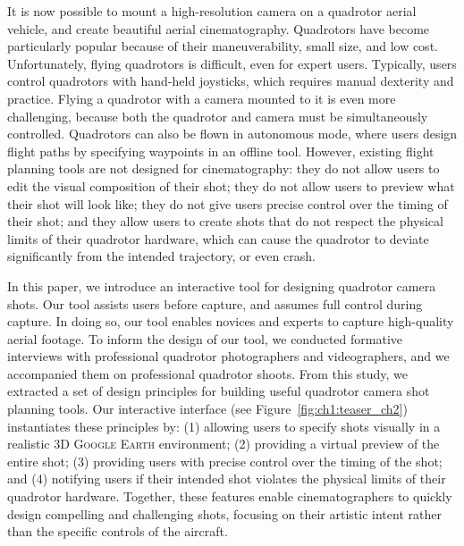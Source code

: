 
It is now possible to mount a high-resolution camera on a quadrotor aerial vehicle, and create beautiful aerial cinematography.
Quadrotors have become particularly popular because of their maneuverability, small size, and low cost.
Unfortunately, flying quadrotors is difficult, even for expert users.
Typically, users control quadrotors with hand-held joysticks, which requires manual dexterity and practice.
Flying a quadrotor with a camera mounted to it is even more challenging, because both the quadrotor and camera must be simultaneously controlled. 
Quadrotors can also be flown in autonomous mode, where users design flight paths by specifying waypoints in an offline tool. 
However, existing flight planning tools are not designed for cinematography: they do not allow users to edit the visual composition of their shot; they do not allow users to preview what their shot will look like; they do not give users precise control over the timing of their shot; and they allow users to create shots that do not respect the physical limits of their quadrotor hardware, which can cause the quadrotor to deviate significantly from the intended trajectory, or even crash.

In this paper, we introduce an interactive tool for  designing quadrotor camera shots. Our tool assists users before capture, and assumes full control during capture.
In doing so, our tool enables novices and experts to capture high-quality aerial footage.
To inform the design of our tool, we conducted formative interviews with professional quadrotor photographers and videographers, and we accompanied them on professional quadrotor shoots.
From this study, we extracted a set of design principles for building useful quadrotor camera shot planning tools. 
Our interactive interface (see Figure~\ref{fig:ch1:teaser_ch2}) instantiates these principles by: (1) allowing users to specify shots visually in a realistic 3D \textsc{Google Earth} environment; (2) providing a virtual preview of the entire shot; (3) providing users with precise control over the timing of the shot; and (4) notifying users if their intended shot violates the physical limits of their quadrotor hardware.
Together, these features enable cinematographers to quickly design compelling and challenging shots, focusing on their artistic intent rather than the specific controls of the aircraft. 

